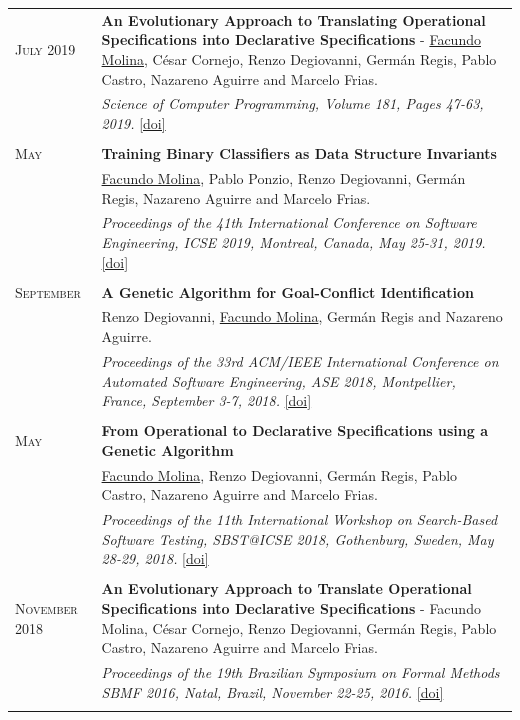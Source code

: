\documentclass[a4paper,10pt]{article} %
\begin{document}
\begin{longtable}{>{\raggedleft\arraybackslash}p{} p{}}
\textsc{July 2019}  & \textbf{An Evolutionary Approach to Translating Operational Specifications into Declarative Specifications} - \underline{Facundo Molina}, César Cornejo, Renzo Degiovanni, Germán Regis, Pablo Castro, Nazareno Aguirre and Marcelo Frias. \\
& \textit{Science of Computer Programming, Volume 181, Pages 47-63, 2019.} \href{https://www.sciencedirect.com/science/article/pii/S0167642319300735}{[doi]} \\ & \\

\textsc{May} & \textbf{Training Binary Classifiers as Data Structure Invariants} \\ 
2019 & \underline{Facundo Molina}, Pablo Ponzio, Renzo Degiovanni, Germán Regis, Nazareno Aguirre and Marcelo Frias. \\
& \textit{Proceedings of the 41th International Conference on Software Engineering, ICSE 2019, Montreal, Canada, May 25-31, 2019.} \href{https://doi.ieeecomputersociety.org/10.1109/ICSE.2019.00084}{[doi]} \\ & \\

\textsc{September}  & \textbf{A Genetic Algorithm for Goal-Conflict Identification} \\ 
2018& Renzo Degiovanni, \underline{Facundo Molina}, Germán Regis and Nazareno Aguirre. \\
& \textit{Proceedings of the 33rd ACM/IEEE International Conference on Automated Software Engineering, ASE 2018, Montpellier, France, September 3-7, 2018.} \href{https://doi.org/10.1145/3238147.3238220}{[doi]} \\ & \\

\textsc{May}  & \textbf{From Operational to Declarative Specifications using a Genetic Algorithm} \\ 
2018 & \underline{Facundo Molina}, Renzo Degiovanni, Germán Regis, Pablo Castro, Nazareno Aguirre and Marcelo Frias. \\
& \textit{Proceedings of the 11th International Workshop on Search-Based Software Testing, SBST@ICSE 2018, Gothenburg, Sweden, May 28-29, 2018.} \href{https://dl.acm.org/doi/10.1145/3194718.3194725}{[doi]} \\ & \\

\textsc{November 2018} & \textbf{An Evolutionary Approach to Translate Operational Specifications into Declarative Specifications} - Facundo Molina, César Cornejo, Renzo Degiovanni, Germán Regis, Pablo Castro, Nazareno Aguirre and Marcelo Frias. \\
& \textit{Proceedings of the 19th Brazilian Symposium on Formal Methods SBMF 2016, Natal, Brazil, November 22-25, 2016.} \href{https://doi.org/10.1007/978-3-319-49815-7_9}{[doi]} \\ & \\

\end{longtable}
\end{document}
